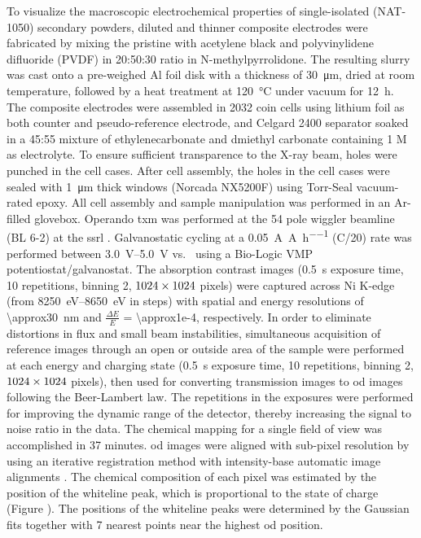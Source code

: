 \documentclass{article}
\begin{document}
To visualize the macroscopic electrochemical properties of
single-isolated \nca{} (NAT-1050) secondary powders, diluted and
thinner composite electrodes were fabricated by mixing the pristine
\nca{} with acetylene black and polyvinylidene difluoride (PVDF) in
20:50:30 ratio in N-methylpyrrolidone. The resulting slurry was cast
onto a pre-weighed Al foil disk with a thickness of
\SI{30}{\micro\meter}, dried at room temperature, followed by a heat
treatment at \SI{120}{\celsius} under vacuum for \SI{12}{\hour}. The
composite electrodes were assembled in  2032 coin cells using lithium foil as both counter
and pseudo-reference electrode, and Celgard 2400 separator soaked in a
45:55 mixture of ethylenecarbonate and dmiethyl carbonate containing 1
M  as electrolyte. To ensure sufficient transparence to the
X-ray beam, holes were punched in the cell cases. After cell assembly,
the holes in the cell cases were sealed with \SI{1}{\micro\meter}
thick  windows (Norcada NX5200F) using Torr-Seal
vacuum-rated epoxy. All cell assembly and sample manipulation was
performed in an Ar-filled glovebox. Operando \gls{txm} was performed
at the 54 pole wiggler beamline (BL 6-2) at the \gls{ssrl}
\cite{yun2008}. Galvanostatic cycling at a
\SI{0.05}{\ampere\per\ampere\per\hour} (C/20) rate was performed
between \SIrange{3.0}{5.0}{\volt} vs.\  using a Bio-Logic
VMP potentiostat/galvanostat. The absorption contrast images
(\SI{0.5}{\second} exposure time, 10 repetitions,
binning 2, $\rm 1024\times 1024$ pixels) were captured across Ni
K-edge (from \SIrange{8250}{8650}{\electronvolt} in  steps) with spatial and energy resolutions of
\SI{\approx30}{\nano\meter} and $\frac{\Delta E}{E}$ =
\num{\approx1e-4}, respectively. In order to eliminate distortions in
flux and small beam instabilities, simultaneous acquisition of
reference images through an open or outside area of the sample were
performed at each energy and charging state (\SI{0.5}{\second}
exposure time, 10 repetitions, binning 2, $\rm 1024
\times 1024$ pixels), then used for converting transmission images to
\gls{od} images following the Beer-Lambert law. The repetitions in the
exposures were performed for improving the dynamic range of the
detector, thereby increasing the signal to noise ratio in the
data. The chemical mapping for a single field of view was accomplished
in 37 minutes. \Gls{od} images were aligned with
sub-pixel resolution by using an iterative registration method with
intensity-base automatic image alignments \cite{lee2019-3}. The
chemical composition of each pixel was estimated by the position of
the whiteline peak, which is proportional to the state of charge
(Figure ). The positions of the
whiteline peaks were determined by the Gaussian fits together with 7
nearest points near the highest \gls{od} position.
\end{document}
